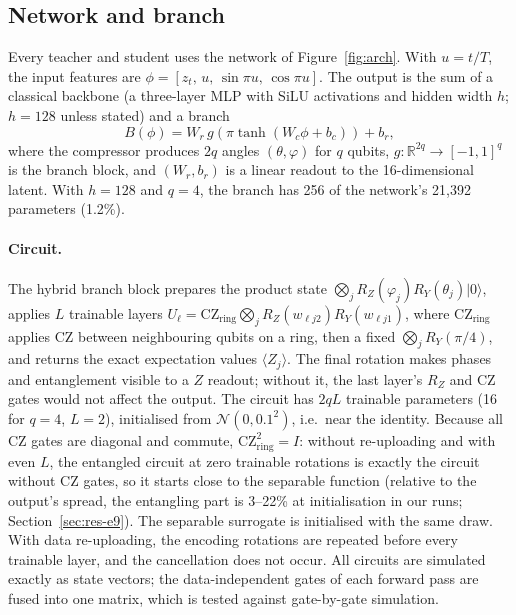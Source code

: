 \documentclass[11pt]{article}
\begin{document}
\subsection{Network and branch}
\label{sec:network}

Every teacher and student uses the network of Figure~\ref{fig:arch}. With $u=t/T$,
the input features are $\phi=[z_t,\,u,\,\sin\pi u,\,\cos\pi u]$. The output
is the sum of a classical backbone (a three-layer MLP with SiLU activations
and hidden width $h$; $h=128$ unless stated) and a branch
\begin{equation}
  B(\phi)=W_r\,g\!\left(\pi\tanh(W_c\phi+b_c)\right)+b_r,
\end{equation}
where the compressor produces $2q$ angles $(\theta,\varphi)$ for $q$ qubits,
$g:\mathbb{R}^{2q}\to[-1,1]^q$ is the branch block, and $(W_r,b_r)$ is a linear
readout to the 16-dimensional latent. With $h=128$ and $q=4$, the branch has 256
of the network's 21{,}392 parameters (1.2\%).

\paragraph{Circuit.} The hybrid branch block prepares the product state
$\bigotimes_j R_Z(\varphi_j)R_Y(\theta_j)|0\rangle$, applies $L$ trainable layers
$U_\ell=\mathrm{CZ}_{\mathrm{ring}}\bigotimes_j R_Z(w_{\ell j2})R_Y(w_{\ell j1})$,
where $\mathrm{CZ}_{\mathrm{ring}}$ applies CZ between neighbouring qubits on a
ring, then a fixed $\bigotimes_j R_Y(\pi/4)$, and returns the exact expectation
values $\langle Z_j\rangle$. The final rotation makes phases and entanglement
visible to a $Z$ readout; without it, the last layer's $R_Z$ and CZ gates would
not affect the output. The circuit has $2qL$ trainable parameters (16 for
$q=4$, $L=2$), initialised from $\mathcal{N}(0,0.1^2)$, i.e.\ near the identity.
Because all CZ gates are diagonal and commute, $\mathrm{CZ}_{\mathrm{ring}}^2=I$:
without re-uploading and with even $L$, the entangled circuit at zero trainable
rotations is exactly the circuit without CZ gates, so it starts close to the
separable function (relative to the output's spread, the entangling part is 3--22\%
at initialisation in our runs; Section~\ref{sec:res-e9}). The separable surrogate
is initialised with the same draw. With data re-uploading, the encoding rotations
are repeated before every trainable layer, and the cancellation does not occur. All circuits are simulated exactly as state vectors; the
data-independent gates of each forward pass are fused into one matrix, which is
tested against gate-by-gate simulation.
\end{document}
